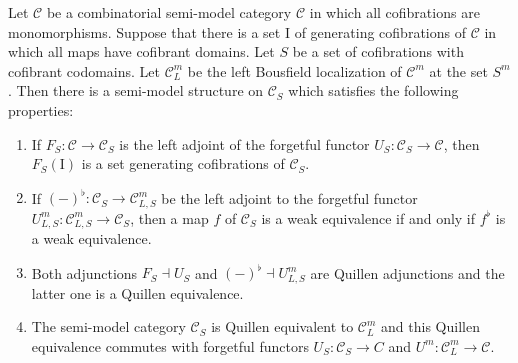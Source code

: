 \documentclass[reqno]{amsart}
\theoremstyle{definition}
\theoremstyle{remark}
\newcommand{\fs}[1]{\mathrm{#1}}
\newcommand{\cat}[1]{\mathcal{#1}}
\newcommand{\C}{\cat{C}}
\newcommand{\I}{\fs{I}}
\numberwithin{figure}{section}
\begin{document}
\begin{thm}
Let $\C$ be a combinatorial semi-model category $\C$ in which all cofibrations are monomorphisms.
Suppose that there is a set $\I$ of generating cofibrations of $\C$ in which all maps have cofibrant domains.
Let $S$ be a set of cofibrations with cofibrant codomains.
Let $\C^m_L$ be the left Bousfield localization of $\C^m$ at the set $S^m$.
Then there is a semi-model structure on $\C_S$ which satisfies the following properties:
\begin{enumerate}
\item \label{it:alg-cof} If $F_S : \C \to \C_S$ is the left adjoint of the forgetful functor $U_S : \C_S \to \C$, then $F_S(\I)$ is a set generating cofibrations of $\C_S$.
\item \label{it:alg-we} If $(-)^\flat : \C_S \to \C^m_{L,S}$ be the left adjoint to the forgetful functor $U^m_{L,S} : \C^m_{L,S} \to \C_S$, then a map $f$ of $\C_S$ is a weak equivalence if and only if $f^\flat$ is a weak equivalence.
\item Both adjunctions $F_S \dashv U_S$ and $(-)^\flat \dashv U^m_{L,S}$ are Quillen adjunctions and the latter one is a Quillen equivalence.
\item \label{it:alg-qe} The semi-model category $\C_S$ is Quillen equivalent to $\C^m_L$ and this Quillen equivalence commutes with forgetful functors $U_S : \C_S \to C$ and $U^m : \C^m_L \to \C$.
\end{enumerate}
\end{thm}
\end{document}
